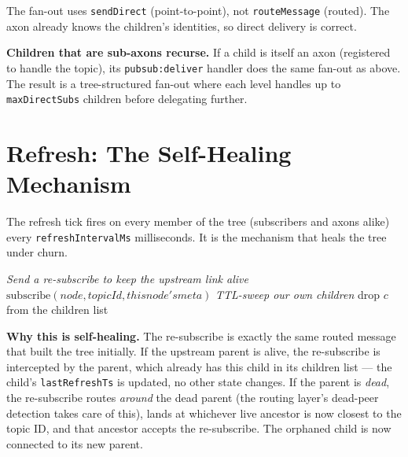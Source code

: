 \documentclass[twoside,nobib]{tufte-book}
\begin{document}
The fan-out uses \texttt{sendDirect} (point-to-point), not
\texttt{routeMessage} (routed). The axon already knows the
children's identities, so direct delivery is correct.

\textbf{Children that are sub-axons recurse.} If a child is
itself an axon (registered to handle the topic), its
\texttt{pubsub:deliver} handler does the same fan-out as above.
The result is a tree-structured fan-out where each level handles
up to \texttt{maxDirectSubs} children before delegating further.

\section{Refresh: The Self-Healing Mechanism}

The refresh tick fires on every member of the tree (subscribers
and axons alike) every \texttt{refreshIntervalMs} milliseconds. It
is the mechanism that heals the tree under churn.

\begin{algorithm}
\caption{refreshTick(node)}
\begin{algorithmic}[1]
  \State \emph{Send a re-subscribe to keep the upstream link
       alive}
  \State $\mathrm{subscribe}(\mathit{node}, \mathit{topicId},
        \mathit{this node's meta})$
  \State \emph{TTL-sweep our own children}
      \State drop $c$ from the children list
    \EndIf
  \EndFor
\EndFor
\end{algorithmic}
\end{algorithm}

\textbf{Why this is self-healing.} The re-subscribe is exactly
the same routed message that built the tree initially. If the
upstream parent is alive, the re-subscribe is intercepted by the
parent, which already has this child in its children list ---
the child's \texttt{lastRefreshTs} is updated, no other state
changes. If the parent is \emph{dead}, the re-subscribe routes
\emph{around} the dead parent (the routing layer's dead-peer
detection takes care of this), lands at whichever live ancestor
is now closest to the topic ID, and that ancestor accepts the
re-subscribe. The orphaned child is now connected to its new
parent.
\end{document}
